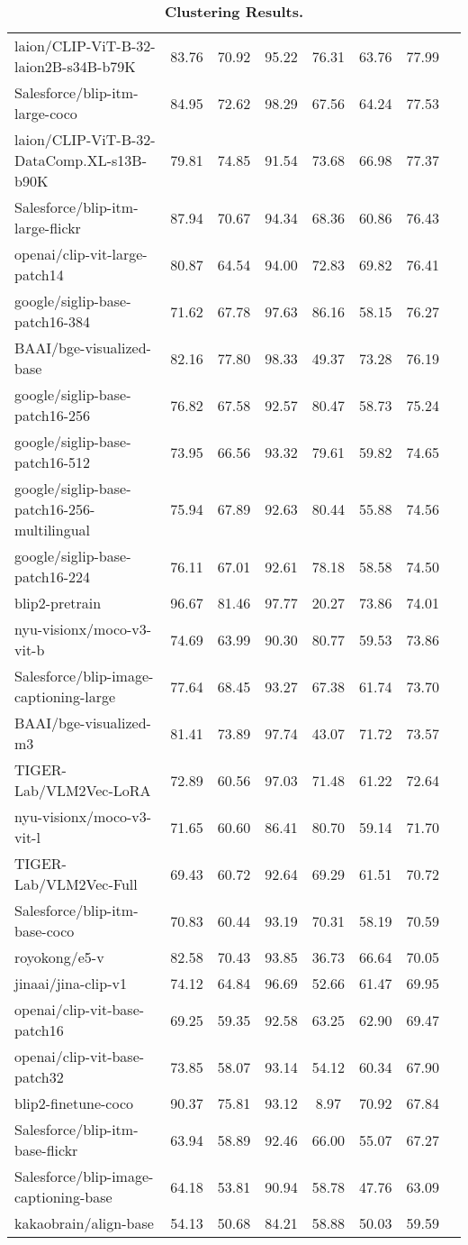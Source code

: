 \begin{table*}
{\begin{tabular}{lccccccc}
laion/CLIP-ViT-B-32-laion2B-s34B-b79K &83.76 &70.92 &95.22 &76.31 &63.76 &77.99 \\
Salesforce/blip-itm-large-coco &84.95 &72.62 &98.29 &67.56 &64.24 &77.53 \\
laion/CLIP-ViT-B-32-DataComp.XL-s13B-b90K &79.81 &74.85 &91.54 &73.68 &66.98 &77.37 \\
Salesforce/blip-itm-large-flickr &87.94 &70.67 &94.34 &68.36 &60.86 &76.43 \\
openai/clip-vit-large-patch14 &80.87 &64.54 &94.00 &72.83 &69.82 &76.41 \\
google/siglip-base-patch16-384 &71.62 &67.78 &97.63 &86.16 &58.15 &76.27 \\
BAAI/bge-visualized-base &82.16 &77.80 &98.33 &49.37 &73.28 &76.19 \\
google/siglip-base-patch16-256 &76.82 &67.58 &92.57 &80.47 &58.73 &75.24 \\
google/siglip-base-patch16-512 &73.95 &66.56 &93.32 &79.61 &59.82 &74.65 \\
google/siglip-base-patch16-256-multilingual &75.94 &67.89 &92.63 &80.44 &55.88 &74.56 \\
google/siglip-base-patch16-224 &76.11 &67.01 &92.61 &78.18 &58.58 &74.50 \\
blip2-pretrain &96.67 &81.46 &97.77 &20.27 &73.86 &74.01 \\
nyu-visionx/moco-v3-vit-b &74.69 &63.99 &90.30 &80.77 &59.53 &73.86 \\
Salesforce/blip-image-captioning-large &77.64 &68.45 &93.27 &67.38 &61.74 &73.70 \\
BAAI/bge-visualized-m3 &81.41 &73.89 &97.74 &43.07 &71.72 &73.57 \\
TIGER-Lab/VLM2Vec-LoRA &72.89 &60.56 &97.03 &71.48 &61.22 &72.64 \\
nyu-visionx/moco-v3-vit-l &71.65 &60.60 &86.41 &80.70 &59.14 &71.70 \\
TIGER-Lab/VLM2Vec-Full &69.43 &60.72 &92.64 &69.29 &61.51 &70.72 \\
Salesforce/blip-itm-base-coco &70.83 &60.44 &93.19 &70.31 &58.19 &70.59 \\
royokong/e5-v &82.58 &70.43 &93.85 &36.73 &66.64 &70.05 \\
jinaai/jina-clip-v1 &74.12 &64.84 &96.69 &52.66 &61.47 &69.95 \\
openai/clip-vit-base-patch16 &69.25 &59.35 &92.58 &63.25 &62.90 &69.47 \\
openai/clip-vit-base-patch32 &73.85 &58.07 &93.14 &54.12 &60.34 &67.90 \\
blip2-finetune-coco &90.37 &75.81 &93.12 &8.97 &70.92 &67.84 \\
Salesforce/blip-itm-base-flickr &63.94 &58.89 &92.46 &66.00 &55.07 &67.27 \\
Salesforce/blip-image-captioning-base &64.18 &53.81 &90.94 &58.78 &47.76 &63.09 \\
kakaobrain/align-base &54.13 &50.68 &84.21 &58.88 &50.03 &59.59 \\
\bottomrule
\end{tabular}}
\caption{\textbf{Clustering Results.}}\label{tab: clustering results}
\end{table*}